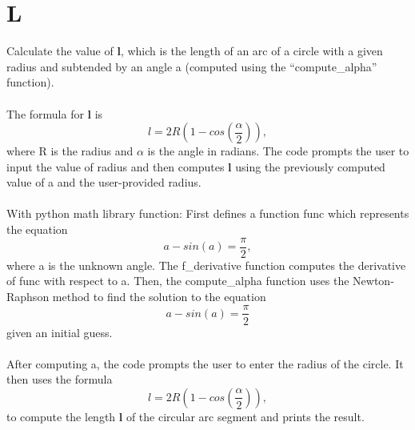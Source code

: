 \section{L}
Calculate the value of \textbf l, which is the length of an arc of a circle with a given radius and subtended by an angle a (computed using the ``compute\_alpha” function).
\\
\\
The formula for \textbf l is 
$$l = 2R(1 - cos(\frac{\alpha}{2})),$$
where R is the radius and $\alpha$ is the angle in radians. 
The code prompts the user to input the value of radius and then computes \textbf l using the previously computed value of a and the user-provided radius. 
\\
\\
With python math library function:
First defines a function func which represents the equation 
$$a - sin(a) = \frac{\pi}{2},$$ 
where a is the unknown angle. The f\_derivative function computes the derivative of func with respect to a. Then, the compute\_alpha function uses the Newton-Raphson method to find the solution to the equation 
$$a - sin(a) = \frac{\pi}{2}$$ given an initial guess.
\\
\\
After computing a, the code prompts the user to enter the radius of the circle. It then uses the formula 
$$l = 2R(1 - cos(\frac{\alpha}{2})),$$  
to compute the length \textbf l of the circular arc segment and prints the result.





